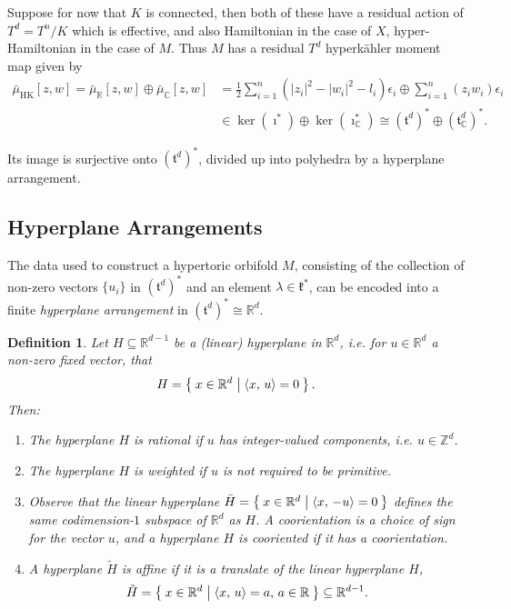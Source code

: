 \documentclass{amsart}
\newtheorem{defn}[theorem]{Definition\rm}
\newcommand{\ie}{\emph{i.e.} }
\newcommand{\e}{\epsilon}
\newcommand{\RR}{\mathbb{R}}
\newcommand{\CC}{\mathbb{C}}
\newcommand{\ZZ}{\mathbb{Z}}
\newcommand{\mfk}{\mathfrak{k}}
\newcommand{\mft}{\mathfrak{t}}
\newcommand{\half}{\frac{1}{2}}
\newcommand{\bmu}{\bar{\mu}}
\DeclareMathOperator{\HK}{HK}
\begin{document}
	Suppose for now that $K$ is connected, then both of these have a residual action of $T^{d} = T^{n}/K$ which is effective, and also Hamiltonian in the case of $X$, hyper-Hamiltonian in the case of $M$. Thus $M$ has a residual $T^{d}$ hyperk\"ahler moment map given by
	\begin{align}
		\bmu_{\HK}[z,w] = \bmu_{\RR}[z,w] \oplus \bmu_{\CC}[z,w] &= \half \sum_{i=1}^{n}(|z_{i}|^{2} - |w_{i}|^{2} - l_{i})\e_{i} \oplus \sum_{i=1}^{n}(z_{i}w_{i})\e_{i} \\
		&\in \ker(\imath^{\ast}) \oplus \ker(\imath_{\CC}^{\ast}) \cong (\mft^{d})^{\ast} \oplus (\mft_{\CC}^{d})^{\ast}.
	\end{align}

	Its image is surjective onto $(\mft^{d})^{\ast}$, divided up into polyhedra by a hyperplane arrangement.

	\subsection{Hyperplane Arrangements}
	
	The data used to construct a hypertoric orbifold $M$, consisting of the collection of non-zero vectors $\{u_{i}\}$ in $(\mft^{d})^{\ast}$ and an element $\lambda \in \mfk^{\ast}$, can be encoded into a finite \emph{hyperplane arrangement} in $(\mft^{d})^{\ast} \cong \RR^{d}$. 
	
	\begin{defn}
		Let $H \subseteq \RR^{d-1}$ be a (linear) hyperplane in $\RR^{d}$, \ie for $u \in \RR^{d}$ a non-zero fixed vector, that
		\[
			H = \Set{x \in \RR^{d} | \langle x,\, u \rangle = 0 }.
		\]
		Then:
		\begin{enumerate}
			\item[(rational) --] The hyperplane $H$ is \emph{rational} if $u$ has integer-valued components, \ie $u \in \ZZ^{d}$.
			\item[(weighted) --] The hyperplane $H$ is \emph{weighted} if $u$ is not required to be primitive.
			\item[(cooriented) --] Observe that the linear hyperplane $\bar{H} = \Set{ x \in \RR^{d} | \langle x,\, -u \rangle = 0}$ defines the same codimension-$1$ subspace of $\RR^{d}$ as $H$.  A \emph{coorientation} is a choice of sign for the vector $u$, and a hyperplane $H$ is \emph{cooriented} if it has a coorientation.
			\item[(affine) --] A hyperplane $\tilde{H}$ is \emph{affine} if it is a translate of the linear hyperplane $H$,
			\[
				\tilde{H} = \Set{x \in \RR^{d} | \langle x,\, u \rangle = a,\, a \in \RR} \subseteq \RR^{d-1}.	
			\]
		\end{enumerate}
	\end{defn}
\end{document}
